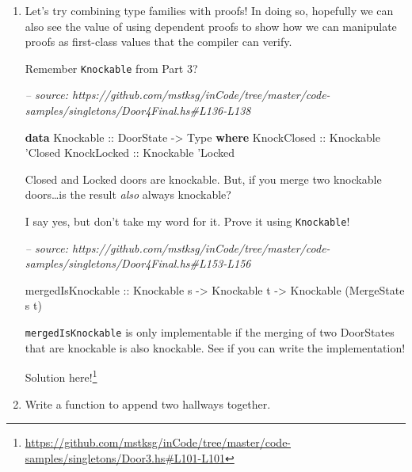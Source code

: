 \documentclass[]{article}
\newenvironment{Shaded}{}{}
\newcommand{\CommentTok}[1]{\textcolor[rgb]{0.38,0.63,0.69}{\textit{#1}}}
\newcommand{\DataTypeTok}[1]{\textcolor[rgb]{0.56,0.13,0.00}{#1}}
\newcommand{\KeywordTok}[1]{\textcolor[rgb]{0.00,0.44,0.13}{\textbf{#1}}}
\newcommand{\NormalTok}[1]{#1}
\newcommand{\OtherTok}[1]{\textcolor[rgb]{0.00,0.44,0.13}{#1}}
\renewcommand{\href}[2]{#2\footnote{\url{#1}}}
\begin{document}
\begin{enumerate}
\def\labelenumi{\arabic{enumi}.}
\item
  Let's try combining type families with proofs! In doing so, hopefully we can
  also see the value of using dependent proofs to show how we can manipulate
  proofs as first-class values that the compiler can verify.

  Remember \texttt{Knockable} from Part 3?

\begin{Shaded}
\begin{Highlighting}[]
\CommentTok{-- source: https://github.com/mstksg/inCode/tree/master/code-samples/singletons/Door4Final.hs#L136-L138}

\KeywordTok{data} \DataTypeTok{Knockable}\OtherTok{ ::} \DataTypeTok{DoorState} \OtherTok{->} \DataTypeTok{Type} \KeywordTok{where}
    \DataTypeTok{KnockClosed}\OtherTok{ ::} \DataTypeTok{Knockable}\NormalTok{ '}\DataTypeTok{Closed}
    \DataTypeTok{KnockLocked}\OtherTok{ ::} \DataTypeTok{Knockable}\NormalTok{ '}\DataTypeTok{Locked}
\end{Highlighting}
\end{Shaded}

  Closed and Locked doors are knockable. But, if you merge two knockable
  doors\ldots{}is the result \emph{also} always knockable?

  I say yes, but don't take my word for it. Prove it using \texttt{Knockable}!

\begin{Shaded}
\begin{Highlighting}[]
\CommentTok{-- source: https://github.com/mstksg/inCode/tree/master/code-samples/singletons/Door4Final.hs#L153-L156}

\NormalTok{mergedIsKnockable}
\OtherTok{    ::} \DataTypeTok{Knockable}\NormalTok{ s}
    \OtherTok{->} \DataTypeTok{Knockable}\NormalTok{ t}
    \OtherTok{->} \DataTypeTok{Knockable}\NormalTok{ (}\DataTypeTok{MergeState}\NormalTok{ s t)}
\end{Highlighting}
\end{Shaded}

  \texttt{mergedIsKnockable} is only implementable if the merging of two
  DoorStates that are knockable is also knockable. See if you can write the
  implementation!

  \href{https://github.com/mstksg/inCode/tree/master/code-samples/singletons/Door3.hs\#L101-L101}{Solution
  here!}
\item
  Write a function to append two hallways together.


\end{enumerate}
\end{document}

